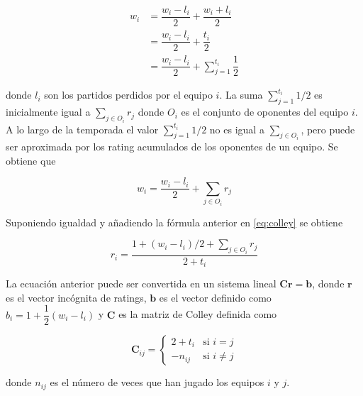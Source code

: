 \begin{align}
w_i & = \dfrac{w_i - l_i}{2} + \dfrac{w_i + l_i}{2} \\
&= \dfrac{w_i - l_i}{2} + \dfrac{t_i}{2} \\
&= \dfrac{w_i - l_i}{2} + \sum_{j=1}^{t_i} \dfrac{1}{2}
\end{align}  

donde $l_i$ son los partidos perdidos por el equipo $i$. La suma $\sum_{j=1}^{t_i} 1/2 $ es inicialmente igual a $\sum_{j \in O_i} r_j$ donde $O_i$ es el conjunto de oponentes del equipo $i$. A lo largo de la temporada el valor $\sum_{j=1}^{t_i} 1/2 $ no es igual a $\sum_{j \in O_i}$, pero puede ser aproximada por los rating acumulados de los oponentes de un equipo. Se obtiene que

\begin{equation}
w_i = \dfrac{w_i - l_i}{2} + \sum_{j \in O_i} r_j
\end{equation}  

Suponiendo igualdad y añadiendo la fórmula anterior en \ref{eq:colley} se obtiene

\begin{equation}
r_i = \dfrac{1+ (w_i - l_i)/2 + \sum_{j \in O_i} r_j }{2 + t_i}
\end{equation}

La ecuación anterior puede ser convertida en un sistema lineal $\mathbf{C r} = \mathbf{b}$, donde $\mathbf{r}$ es el vector incógnita de ratings, $\mathbf{b}$ es el vector definido como $b_i = 1 + \dfrac{1}{2}(w_i - l_i)$ y $\mathbf{C}$ es la matriz de Colley definida como

\begin{equation}\label{eq:colley_matriz}
\mathbf{C}_{ij} = \begin{cases}
2 + t_i & \text{si } i = j\\
-n_{ij} & \text{si } i \neq j
\end{cases}
\end{equation}

donde $n_{ij}$ es el número de veces que han jugado los equipos $i$ y $j$.

